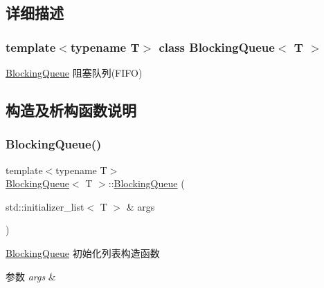 \subsection{详细描述}
\subsubsection*{template$<$typename T$>$\newline
class Blocking\+Queue$<$ T $>$}

\hyperlink{classBlockingQueue}{Blocking\+Queue} 阻塞队列(\+F\+I\+F\+O) 

\subsection{构造及析构函数说明}
\mbox{\label{classBlockingQueue_a265931efcceccd5c99ac76178507559b}} 
\subsubsection{\texorpdfstring{Blocking\+Queue()}{BlockingQueue()}\hspace{0.1cm}{\footnotesize\ttfamily [1/3]}}
{\footnotesize\ttfamily template$<$typename T$>$ \\
\hyperlink{classBlockingQueue}{Blocking\+Queue}$<$ T $>$\+::\hyperlink{classBlockingQueue}{Blocking\+Queue} (\begin{DoxyParamCaption}\item[{std\+::initializer\+\_\+list$<$ T $>$ \&}]{args }\end{DoxyParamCaption})\hspace{0.3cm}{\ttfamily [inline]}}



\hyperlink{classBlockingQueue}{Blocking\+Queue} 初始化列表构造函数 


\begin{DoxyParams}{参数}
{\em args} & \\
\hline
\end{DoxyParams}
\mbox{\label{classBlockingQueue_a2f2b1e4d887d77a81fddabd44c5cdbfd}} 
